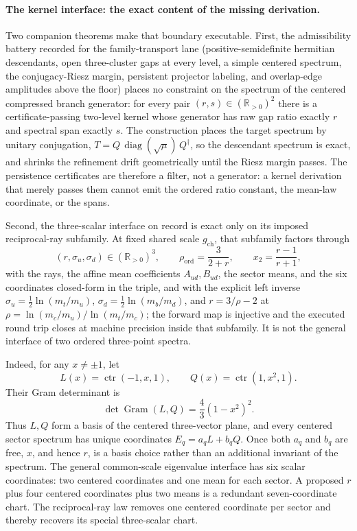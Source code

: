 \documentclass[11pt]{article}
\begin{document}
\paragraph{The kernel interface: the exact content of the missing derivation.}
Two companion theorems make that boundary executable. First, the admissibility battery recorded
for the family-transport lane (positive-semidefinite hermitian descendants, open three-cluster
gaps at every level, a simple centered spectrum, the conjugacy-Riesz margin, persistent projector
labeling, and overlap-edge amplitudes above the floor) places no constraint on the spectrum of
the centered compressed branch generator: for every pair \((r,s)\in(\mathbb R_{>0})^2\) there is a
certificate-passing two-level kernel whose generator has raw gap ratio exactly \(r\) and spectral
span exactly \(s\). The construction places the target spectrum by unitary conjugation,
\(T=Q\,\operatorname{diag}(\sqrt{\mu})\,Q^{\dagger}\), so the descendant spectrum is exact, and
shrinks the refinement drift geometrically until the Riesz margin passes. The persistence
certificates are therefore a filter, not a generator: a kernel derivation that merely passes them
cannot emit the ordered ratio constant, the mean-law coordinate, or the spans.

Second, the three-scalar interface on record is exact only on its imposed reciprocal-ray
subfamily.  At fixed shared scale \(g_{\mathrm{ch}}\), that subfamily factors through
\[
(r,\sigma_u,\sigma_d)\in(\mathbb R_{>0})^3,
\qquad
\rho_{\mathrm{ord}}=\frac{3}{2+r},
\qquad
x_2=\frac{r-1}{r+1},
\]
with the rays, the affine mean coefficients \(A_{ud},B_{ud}\), the sector means, and the six
coordinates closed-form in the triple, and with the explicit left inverse
\(\sigma_u=\tfrac12\ln(m_t/m_u)\), \(\sigma_d=\tfrac12\ln(m_b/m_d)\), and \(r=3/\rho-2\) at
\(\rho=\ln(m_c/m_u)/\ln(m_t/m_c)\); the forward map is injective and the executed round trip
closes at machine precision inside that subfamily.  It is not the general interface of two
ordered three-point spectra.

Indeed, for any \(x\ne\pm1\), let
\[
L(x)=\operatorname{ctr}(-1,x,1),
\qquad
Q(x)=\operatorname{ctr}(1,x^2,1).
\]
Their Gram determinant is
\[
\det\operatorname{Gram}(L,Q)=\frac43(1-x^2)^2.
\]
Thus \(L,Q\) form a basis of the centered three-vector plane, and every centered sector spectrum
has unique coordinates \(E_q=a_qL+b_qQ\).  Once both \(a_q\) and \(b_q\) are free, \(x\), and
hence \(r\), is a basis choice rather than an additional invariant of the spectrum.  The general
common-scale eigenvalue interface has six scalar coordinates: two centered coordinates and one
mean for each sector.  A proposed \(r\) plus four centered coordinates plus two means is a
redundant seven-coordinate chart. The reciprocal-ray law removes one centered coordinate per sector and
thereby recovers its special three-scalar chart.
\end{document}
